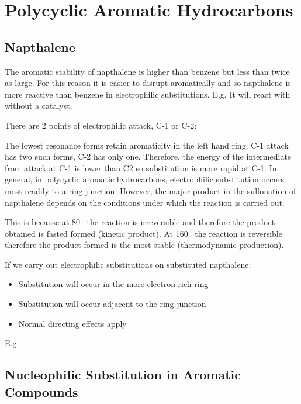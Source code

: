 \section{Polycyclic Aromatic Hydrocarbons}

\subsection{Napthalene}


The aromatic stability of napthalene is higher than benzene but less than twice as large.
For this reason it is easier to disrupt aromatically and so napthalene is more reactive than benzene in electrophilic substitutions.
E.g. It will react with  without a catalyst.

There are 2 points of electrophilic attack, C-1 or C-2:


The lowest resonance forms retain aromaticity in the left hand ring. C-1 attack has two such forms, C-2 has only one.
Therefore, the energy of the intermediate from attack at C-1 is lower than C2 so substitution is more rapid at C-1.
In general, in polycyclic aromatic hydrocarbons, electrophilic substitution occurs most readily to a ring junction.
However, the major product in the sulfonation of napthalene depends on the conditions under which the reaction is carried out.


This is because at 80 \dec\ the reaction is irreversible and therefore the product obtained is fasted formed (kinetic product).
At 160 \dec\ the reaction is reversible therefore the product formed is the most stable (thermodynamic production).

If we carry out electrophilic substitutions on substituted napthalene:
\begin{itemize}
  \item Substitution will occur in the more electron rich ring
  \item Substitution will occur adjacent to the ring junction
  \item Normal directing effects apply
\end{itemize}

E.g.


\subsection{Nucleophilic Substitution in Aromatic Compounds}

